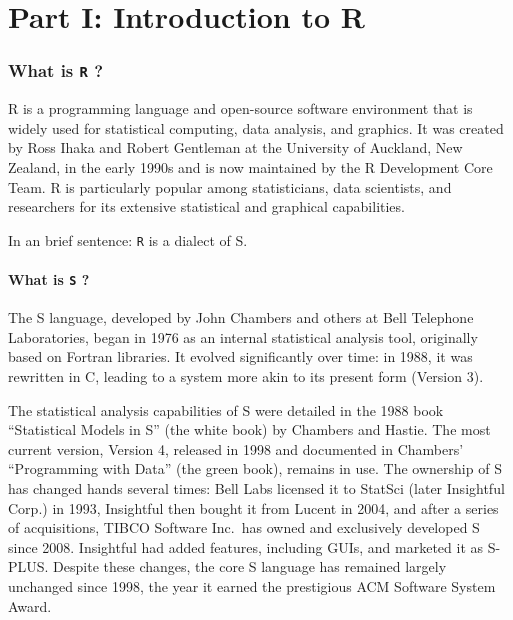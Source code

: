 \documentclass[
]{book}
\begin{document}
\chapter*{Part I: Introduction to R}\label{part-i-introduction-to-r}

\subsection*{\texorpdfstring{What is \texttt{R} ?}{What is R ?}}\label{what-is-r}

R is a programming language and open-source software environment that is widely used for statistical computing, data analysis, and graphics. It was created by Ross Ihaka and Robert Gentleman at the University of Auckland, New Zealand, in the early 1990s and is now maintained by the R Development Core Team. R is particularly popular among statisticians, data scientists, and researchers for its extensive statistical and graphical capabilities.

In an brief sentence: \texttt{R} is a dialect of S.

\subsubsection*{\texorpdfstring{What is \texttt{S} ?}{What is S ?}}\label{what-is-s}

The S language, developed by John Chambers and others at Bell Telephone Laboratories, began in 1976 as an internal statistical analysis tool, originally based on Fortran libraries. It evolved significantly over time: in 1988, it was rewritten in C, leading to a system more akin to its present form (Version 3).

The statistical analysis capabilities of S were detailed in the 1988 book ``Statistical Models in S'' (the white book) by Chambers and Hastie. The most current version, Version 4, released in 1998 and documented in Chambers' ``Programming with Data'' (the green book), remains in use. The ownership of S has changed hands several times: Bell Labs licensed it to StatSci (later Insightful Corp.) in 1993, Insightful then bought it from Lucent in 2004, and after a series of acquisitions, TIBCO Software Inc.~has owned and exclusively developed S since 2008. Insightful had added features, including GUIs, and marketed it as S-PLUS. Despite these changes, the core S language has remained largely unchanged since 1998, the year it earned the prestigious ACM Software System Award.
\end{document}
